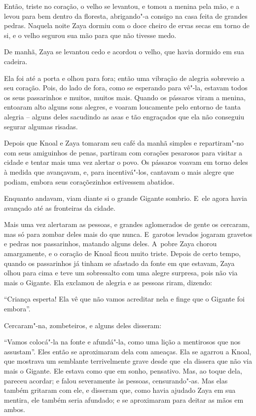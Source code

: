 Então, triste no coração, o velho se levantou, e tomou a menina pela
mão, e a levou para bem dentro da floresta, abrigando"-a consigo na casa
feita de grandes pedras. Naquela noite Zaya dormiu com o doce cheiro de
ervas secas em torno de si, e o velho segurou sua mão para que não
tivesse medo.

De manhã, Zaya se levantou cedo e acordou o velho, que havia dormido em
sua cadeira.

Ela foi até a porta e olhou para fora; então uma vibração de alegria
sobreveio a seu coração. Pois, do lado de fora, como se esperando para
vê"-la, estavam todos os seus passarinhos e muitos, muitos mais. Quando
os pássaros viram a menina, entoaram alto alguns sons alegres, e voaram
loucamente pelo entorno de tanta alegria -- alguns deles sacudindo as
asas e tão engraçados que ela não conseguiu segurar algumas risadas.

Depois que Knoal e Zaya tomaram seu café da manhã simples e
repartiram"-no com seus amiguinhos de penas, partiram com corações
pesarosos para visitar a cidade e tentar mais uma vez alertar o povo. Os
pássaros voavam em torno deles à medida que avançavam, e, para
incentivá"-los, cantavam o mais alegre que podiam, embora seus
coraçõezinhos estivessem abatidos.

Enquanto andavam, viam diante si o grande Gigante sombrio. E~ele agora
havia avançado até as fronteiras da cidade.

Mais uma vez alertaram as pessoas, e grandes aglomerados de gente os
cercaram, mas só para zombar deles mais do que nunca. E~garotos levados
jogaram gravetos e pedras nos passarinhos, matando alguns deles. A~pobre
Zaya chorou amargamente, e o coração de Knoal ficou muito triste. Depois
de certo tempo, quando os passarinhos já tinham se afastado da fonte em
que estavam, Zaya olhou para cima e teve um sobressalto com uma alegre
surpresa, pois não via mais o Gigante. Ela exclamou de alegria e as
pessoas riram, dizendo:

``Criança esperta! Ela vê que não vamos acreditar nela e finge que o
Gigante foi embora''.

Cercaram"-na, zombeteiros, e alguns deles disseram:

``Vamos colocá"-la na fonte e afundá"-la, como uma lição a mentirosos que
nos assustam''. Eles então se aproximaram dela com ameaças. Ela se
agarrou a Knoal, que mostrava um semblante terrivelmente grave desde que~ela dissera que não via mais o Gigante. Ele estava como que em sonho,
pensativo. Mas, ao toque dela, pareceu acordar; e falou severamente às
pessoas, censurando"-as. Mas elas também gritaram com ele, e disseram
que, como havia ajudado Zaya em sua mentira, ele também seria afundado;
e se aproximaram para deitar as mãos em ambos.

